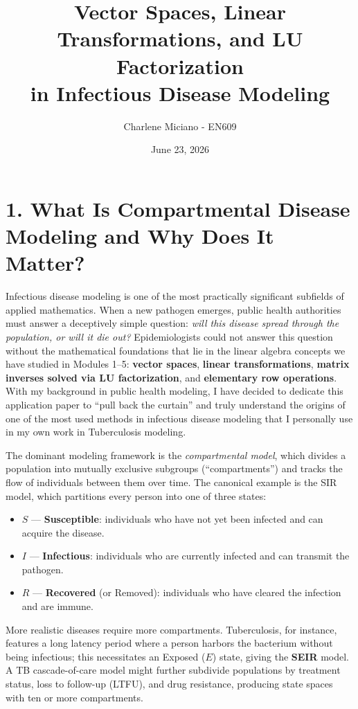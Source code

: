 \documentclass[12pt]{article}
\title{\textbf{Vector Spaces, Linear Transformations, and LU Factorization\\ in Infectious Disease Modeling}}
\author{Charlene Miciano - EN609}
\date{June 23, 2026}
\theoremstyle{plain}
\theoremstyle{definition}
\begin{document}
\maketitle
\thispagestyle{empty}

\newpage

\section*{1. \quad What Is Compartmental Disease Modeling and Why Does It Matter?}

Infectious disease modeling is one of the most practically significant subfields of applied
mathematics. When a new pathogen emerges, public health authorities must answer a
deceptively simple question: \emph{will this disease spread through the population, or will
it die out?} Epidemiologists could not answer this question without the mathematical
foundations that lie in the linear algebra concepts we have studied in Modules 1--5:
\textbf{vector spaces}, \textbf{linear transformations}, \textbf{matrix inverses solved
via LU factorization}, and \textbf{elementary row operations}. With my background in
public health modeling, I have decided to dedicate this application paper to ``pull back
the curtain'' and truly understand the origins of one of the most used methods in
infectious disease modeling that I personally use in my own work in Tuberculosis modeling.

The dominant modeling framework is the \emph{compartmental model}, which divides a
population into mutually exclusive subgroups (``compartments'') and tracks the flow of
individuals between them over time. The canonical example is the SIR model, which
partitions every person into one of three states:

\begin{itemize}
  \item $S$ --- \textbf{Susceptible}: individuals who have not yet been infected and can
  acquire the disease.
  \item $I$ --- \textbf{Infectious}: individuals who are currently infected and can
  transmit the pathogen.
  \item $R$ --- \textbf{Recovered} (or Removed): individuals who have cleared the
  infection and are immune.
\end{itemize}

More realistic diseases require more compartments. Tuberculosis, for instance, features a
long latency period where a person harbors the bacterium without being infectious; this
necessitates an Exposed ($E$) state, giving the \textbf{SEIR} model. A TB cascade-of-care
model might further subdivide populations by treatment status, loss to follow-up (LTFU),
and drug resistance, producing state spaces with ten or more compartments.
\end{document}
